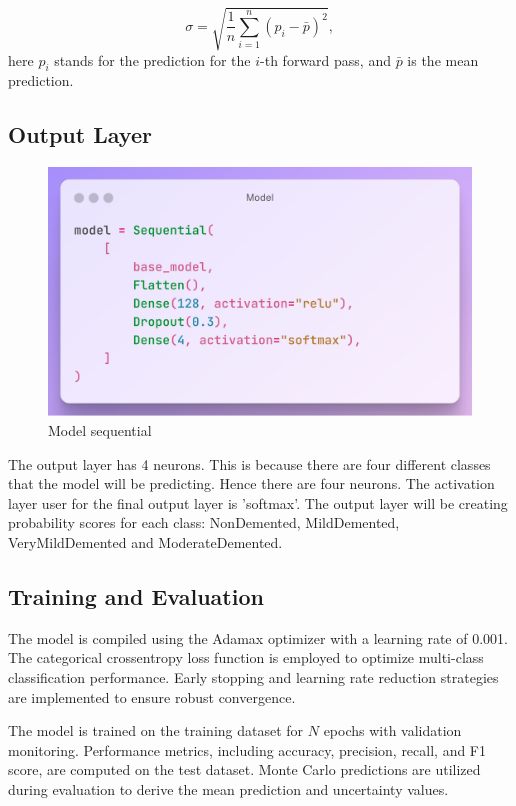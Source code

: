 \documentclass[12pt,onecolumn]{report}
\begin{document}
\begin{equation}
\sigma = \sqrt{\frac{1}{n} \sum_{i=1}^{n} (p_i - \bar{p})^2},
\end{equation}
here $p_i$ stands for the prediction for the $i$-th forward pass, and $\bar{p}$ is the mean prediction.

\subsection{Output Layer}
\begin{figure}[h!]
    \centering
    \includegraphics[width=0.8\columnwidth]{figures/model_sequential.png}  %
    \caption{Model sequential} %
    \label{fig:sequential model} %
\end{figure}
The output layer has 4 neurons. This is because there are four different classes that the model will be predicting. Hence there are four neurons. The activation layer user for the final output layer is 'softmax'. The output layer will be creating probability scores for each class: NonDemented, MildDemented, VeryMildDemented and ModerateDemented. 

\subsection{Training and Evaluation}
The model is compiled using the Adamax optimizer with a learning rate of 0.001. The categorical crossentropy loss function is employed to optimize multi-class classification performance. Early stopping and learning rate reduction strategies are implemented to ensure robust convergence.

The model is trained on the training dataset for $N$ epochs with validation monitoring. Performance metrics, including accuracy, precision, recall, and F1 score, are computed on the test dataset. Monte Carlo predictions are utilized during evaluation to derive the mean prediction and uncertainty values.
\end{document}
